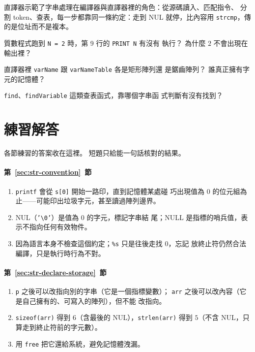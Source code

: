 直譯器示範了字串處理在編譯器與直譯器裡的角色：從源碼讀入、匹配指令、
分割 token、查表，每一步都靠同一條約定：走到 NUL 就停，比內容用
\texttt{strcmp}，傳的是位址而不是複本。


\begin{drills}[label=drills:str-basic-interp]
\item 質數程式跑到 \texttt{N = 2} 時，第 9 行的 \texttt{PRINT N} 有沒有
執行？ 為什麼 $2$ 不會出現在輸出裡？
\item 直譯器裡 \texttt{varName} 跟 \texttt{varNameTable} 各是矩形陣列還
是鋸齒陣列？ 誰真正擁有字元的記憶體？
\item \texttt{find}、\texttt{findVariable} 這類查表函式，靠哪個字串函
式判斷有沒有找到？
\end{drills}

\section*{練習解答}

各節練習的答案收在這裡。 短題只給能一句話核對的結果。

\paragraph{第~\ref{sec:str-convention}~節}
\begin{enumerate}
\item \texttt{printf} 會從 \texttt{s[0]} 開始一路印，直到記憶體某處碰
巧出現值為 $0$ 的位元組為止——可能印出垃圾字元，甚至讀過陣列邊界。
\item NUL（\texttt{'\textbackslash 0'}）是值為 $0$ 的字元，標記字串結
尾；NULL 是指標的哨兵值，表示不指向任何有效物件。
\item 因為語言本身不檢查這個約定；\texttt{\%s} 只是往後走找 $0$，忘記
放終止符仍然合法編譯，只是執行時行為不對。
\end{enumerate}

\paragraph{第~\ref{sec:str-declare-storage}~節}
\begin{enumerate}
\item \texttt{p} 之後可以改指向別的字串（它是一個指標變數）；
\texttt{arr} 之後可以改內容（它是自己擁有的、可寫入的陣列），但不能
改指向。
\item \texttt{sizeof(arr)} 得到 $6$（含最後的 NUL），\texttt{strlen(arr)}
得到 $5$（不含 NUL，只算走到終止符前的字元數）。
\item 用 \texttt{free} 把它還給系統，避免記憶體洩漏。
\end{enumerate}

